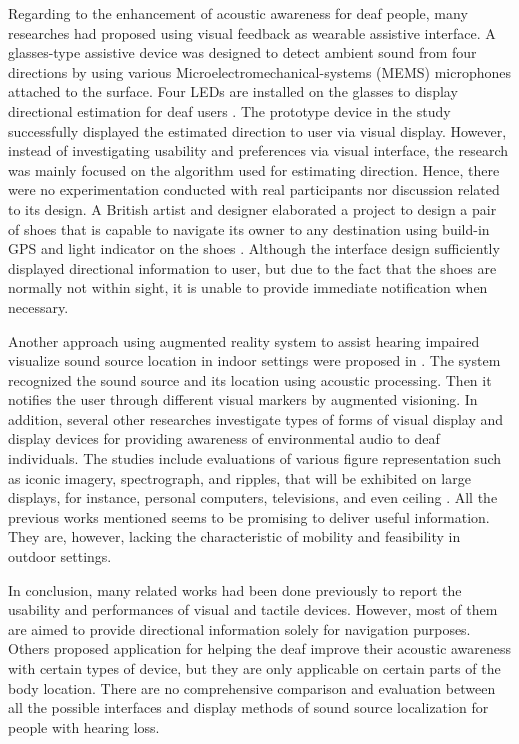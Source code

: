 \documentclass{sigchi}
\begin{document}
Regarding to the enhancement of acoustic awareness for deaf people, many researches had proposed using visual feedback as wearable assistive interface. A glasses-type assistive device was designed to detect ambient sound from four directions by using various Microelectromechanical-systems (MEMS) microphones attached to the surface. Four LEDs are installed on the glasses to display directional estimation for deaf users \cite{Kim2013}. The prototype device in the study successfully displayed the estimated direction to user via visual display. However, instead of investigating usability and preferences via visual interface, the research was mainly focused on the algorithm used for estimating direction. Hence, there were no experimentation conducted with real participants nor discussion related to its design. A British artist and designer elaborated a project to design a pair of shoes that is capable to navigate its owner to any destination using build-in GPS and light indicator on the shoes \cite{Wilcox2012}. Although the interface design sufficiently displayed directional information to user, but due to the fact that the shoes are normally not within sight, it is unable to provide immediate notification when necessary.

Another approach using augmented reality system to assist hearing impaired visualize sound source location in indoor settings were proposed in \cite{Shen2012}. The system recognized the sound source and its location using acoustic processing. Then it notifies the user through different visual markers by augmented visioning. In addition, several other researches investigate types of forms of visual display and display devices for providing awareness of environmental audio to deaf individuals. The studies include evaluations of various figure representation such as iconic imagery, spectrograph, and ripples, that will be exhibited on large displays, for instance, personal computers, televisions, and even ceiling \cite{Ho-Ching2003,Matthews2006a,Matthews2005,Tomitsch2007}. All the previous works mentioned seems to be promising to deliver useful information. They are, however, lacking the characteristic of mobility and feasibility in outdoor settings.

In conclusion, many related works had been done previously to report the usability and performances of visual and tactile devices. However, most of them are aimed to provide directional information solely for navigation purposes. Others proposed application for helping the deaf improve their acoustic awareness with certain types of device, but they are only applicable on certain parts of the body location. There are no comprehensive comparison and evaluation between all the possible interfaces and display methods of sound source localization for people with hearing loss.
\end{document}
